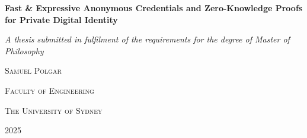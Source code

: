 \begin{titlepage}
    \centering
       {\Huge \textbf{Fast \& Expressive Anonymous Credentials and Zero-Knowledge Proofs for Private Digital Identity} \par} \vspace{1.5cm}
    {\large \emph{A thesis submitted in fulfilment of the requirements for the degree of Master of Philosophy}\par} \vspace{2cm}
    {\LARGE \textsc{Samuel Polgar} \par} \vspace{9cm}
    {\Large \textsc{Faculty of Engineering}\par}
    {\Large \textsc{The University of Sydney} \par} \vspace{1cm}
    {\large 2025}
\end{titlepage}


